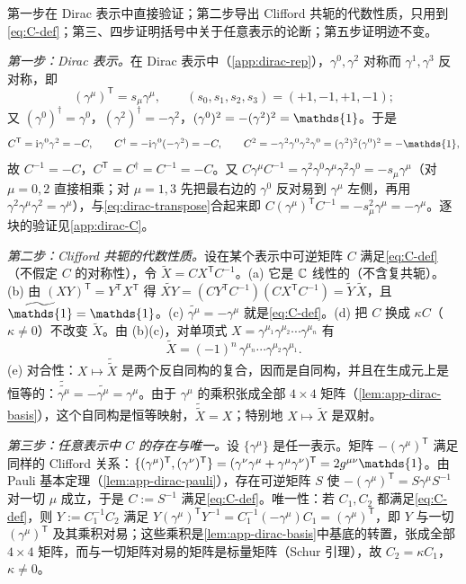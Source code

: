 \documentclass[UTF8,a4paper,11pt,fontset=fandol]{ctexart}
\makeatletter
\let\amsmathbb\mathbb
\renewcommand{\mathbb}[1]{\ifx1#1\mathds{1}\else\amsmathbb{#1}\fi}
\theoremstyle{cplain}
\theoremstyle{cdefinition}
\theoremstyle{cremark}
\renewcommand{\proofname}{证明}
\renewenvironment{proof}[1][\proofname]{\par\pushQED{\qed}\normalfont\topsep6\p@\@plus6\p@\relax
  \trivlist\item[\hskip\labelsep\itshape #1\hspace{0.5em}]\ignorespaces}{\popQED\endtrivlist\@endpefalse}
\numberwithin{equation}{section}
\newcommand{\tp}{\mathsf{T}}                         %
\newcommand{\ii}{\mathrm{i}}                        %
\newcommand{\Cconj}[1]{\widetilde{#1}}              %
\makeatother
\begin{document}
\begin{proof}
第一步在 Dirac 表示中直接验证；第二步导出 Clifford 共轭的代数性质，只用到\cref{eq:C-def}；第三、四步证明括号中关于任意表示的论断；第五步证明迹不变。

\emph{第一步：Dirac 表示。}在 Dirac 表示中（\cref{app:dirac-rep}），$\gamma^0,\gamma^2$ 对称而 $\gamma^1,\gamma^3$ 反对称，即
\begin{equation}\label{eq:dirac-transpose}
(\gamma^\mu)^{\tp}=s_\mu\gamma^\mu,\qquad (s_0,s_1,s_2,s_3)=(+1,-1,+1,-1);
\end{equation}
又 $(\gamma^0)^\dagger=\gamma^0$，$(\gamma^2)^\dagger=-\gamma^2$，$(\gamma^0)^2=-(\gamma^2)^2=\mathbb 1$。于是
\[
C^{\tp}=\ii\gamma^0\gamma^2=-C,\qquad C^\dagger=-\ii\gamma^0(-\gamma^2)=-C,\qquad C^2=-\gamma^2\gamma^0\gamma^2\gamma^0=(\gamma^2)^2(\gamma^0)^2=-\mathbb 1,
\]
故 $C^{-1}=-C$，$C^{\tp}=C^\dagger=C^{-1}=-C$。又 $C\gamma^\mu C^{-1}=\gamma^2\gamma^0\gamma^\mu\gamma^2\gamma^0=-s_\mu\gamma^\mu$（对 $\mu=0,2$ 直接相乘；对 $\mu=1,3$ 先把最右边的 $\gamma^0$ 反对易到 $\gamma^\mu$ 左侧，再用 $\gamma^2\gamma^\mu\gamma^2=\gamma^\mu$），与\cref{eq:dirac-transpose}合起来即 $C(\gamma^\mu)^{\tp}C^{-1}=-s_\mu^2\gamma^\mu=-\gamma^\mu$。逐块的验证见\cref{app:dirac-C}。

\emph{第二步：Clifford 共轭的代数性质。}设在某个表示中可逆矩阵 $C$ 满足\cref{eq:C-def}（不假定 $C$ 的对称性），令 $\Cconj X=CX^{\tp}C^{-1}$。(a) 它是 $\mathbb C$ 线性的（不含复共轭）。(b) 由 $(XY)^{\tp}=Y^{\tp}X^{\tp}$ 得 $\Cconj{XY}=(CY^{\tp}C^{-1})(CX^{\tp}C^{-1})=\Cconj Y\,\Cconj X$，且 $\Cconj{\mathbb 1}=\mathbb 1$。(c) $\Cconj{\gamma^\mu}=-\gamma^\mu$ 就是\cref{eq:C-def}。(d) 把 $C$ 换成 $\kappa C$（$\kappa\neq0$）不改变 $\Cconj X$。由 (b)(c)，对单项式 $X=\gamma^{\mu_1}\gamma^{\mu_2}\cdots\gamma^{\mu_n}$ 有
\begin{equation}\label{eq:dirac-monomial}
\Cconj X=(-1)^n\,\gamma^{\mu_n}\cdots\gamma^{\mu_2}\gamma^{\mu_1}.
\end{equation}
(e) 对合性：$X\mapsto\Cconj{\Cconj X}$ 是两个反自同构的复合，因而是自同构，并且在生成元上是恒等的：$\Cconj{\Cconj{\gamma^\mu}}=-\Cconj{\gamma^\mu}=\gamma^\mu$。由于 $\gamma^\mu$ 的乘积张成全部 $4\times4$ 矩阵（\cref{lem:app-dirac-basis}），这个自同构是恒等映射，$\Cconj{\Cconj X}=X$；特别地 $X\mapsto\Cconj X$ 是双射。

\emph{第三步：任意表示中 $C$ 的存在与唯一。}设 $\{\gamma^\mu\}$ 是任一表示。矩阵 $-(\gamma^\mu)^{\tp}$ 满足同样的 Clifford 关系：$\{(\gamma^\mu)^{\tp},(\gamma^\nu)^{\tp}\}=(\gamma^\nu\gamma^\mu+\gamma^\mu\gamma^\nu)^{\tp}=2g^{\mu\nu}\mathbb 1$。由 Pauli 基本定理（\cref{lem:app-dirac-pauli}），存在可逆矩阵 $S$ 使 $-(\gamma^\mu)^{\tp}=S\gamma^\mu S^{-1}$ 对一切 $\mu$ 成立，于是 $C:=S^{-1}$ 满足\cref{eq:C-def}。唯一性：若 $C_1,C_2$ 都满足\cref{eq:C-def}，则 $Y:=C_1^{-1}C_2$ 满足 $Y(\gamma^\mu)^{\tp}Y^{-1}=C_1^{-1}(-\gamma^\mu)C_1=(\gamma^\mu)^{\tp}$，即 $Y$ 与一切 $(\gamma^\mu)^{\tp}$ 及其乘积对易；这些乘积是\cref{lem:app-dirac-basis}中基底的转置，张成全部 $4\times4$ 矩阵，而与一切矩阵对易的矩阵是标量矩阵（Schur 引理），故 $C_2=\kappa C_1$，$\kappa\neq0$。


\end{proof}
\end{document}
